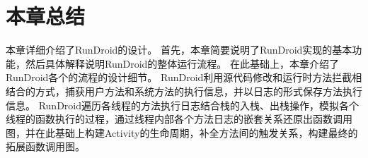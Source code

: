  \section{本章总结}

本章详细介绍了RunDroid的设计。
首先，本章简要说明了RunDroid实现的基本功能，然后具体解释说明RunDroid的整体运行流程。
在此基础上，本章介绍了RunDroid各个的流程的设计细节。
RunDroid利用源代码修改和运行时方法拦截相结合的方式，捕获用户方法和系统方法的执行信息，并以日志的形式保存方法执行信息。
RunDroid遍历各线程的方法执行日志结合栈的入栈、出栈操作，模拟各个线程的函数执行的过程，通过线程内部各个方法日志的嵌套关系还原出函数调用图，并在此基础上构建Activity的生命周期，补全方法间的触发关系，构建最终的拓展函数调用图。

